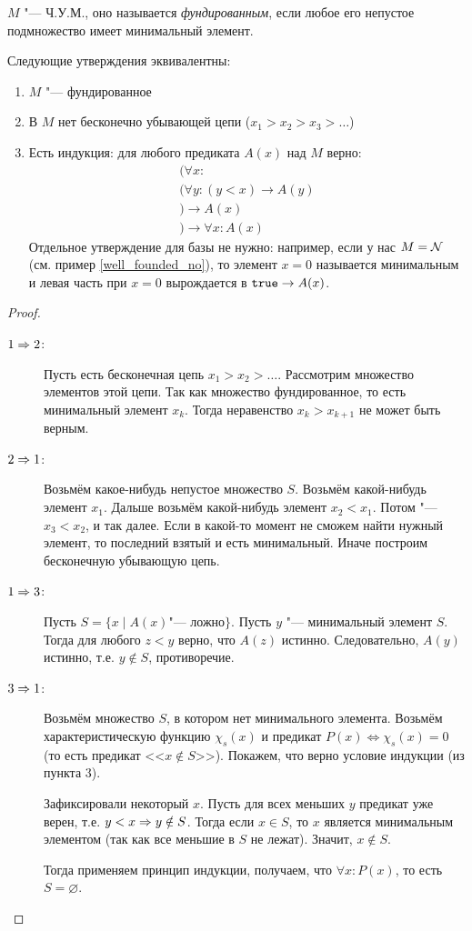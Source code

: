 \begin{Def}
	$M$ "--- Ч.У.М., оно называется \textit{фундированным}, если любое его непустое подмножество
	имеет минимальный элемент.
\end{Def}
\begin{theorem}
	Следующие утверждения эквивалентны:
	\begin{enumerate}
		\item $M$ "--- фундированное
		\item В $M$ нет бесконечно убывающей цепи ($x_1 > x_2 > x_3 > \dots$)
		\item
			Есть индукция: для любого предиката $A(x)$ над $M$ верно:
			\begin{gather*}
				(\forall x \colon\\
					(\forall y\colon (y < x) \to A(y) \\
					) \to A(x) \\
				) \to \forall x \colon A(x)
			\end{gather*}
			Отдельное утверждение для базы не нужно: например, если у нас $M=\mathcal{N}$ (см. пример \ref{well_founded_no}),
			то элемент $x=0$ называется минимальным и левая часть при $x=0$ вырождается в $\texttt{true} \to A(x)$.
	\end{enumerate}
\end{theorem}
\begin{proof}
	\begin{description}
		\item[$1 \Rightarrow 2$:]
			Пусть есть бесконечная цепь $x_1 > x_2 > \dots$.
			Рассмотрим множество элементов этой цепи.
			Так как множество фундированное, то есть минимальный элемент $x_k$.
			Тогда неравенство $x_k > x_{k+1}$ не может быть верным.

		\item[$2 \Rightarrow 1$:]
			Возьмём какое-нибудь непустое множество $S$.
			Возьмём какой-нибудь элемент $x_1$.
			Дальше возьмём какой-нибудь элемент $x_2 < x_1$.
			Потом "--- $x_3 < x_2$, и так далее.
			Если в какой-то момент не сможем найти нужный элемент, то последний взятый и есть минимальный.
			Иначе построим бесконечную убывающую цепь.

		\item[$1 \Rightarrow 3$:]
			Пусть $S=\{x \mid A(x) \text{"--- ложно}\}$.
			Пусть $y$ "--- минимальный элемент $S$.
			Тогда для любого $z<y$ верно, что $A(z)$ истинно.
			Следовательно, $A(y)$ истинно, т.е. $y \notin S$, противоречие.

		\item[$3 \Rightarrow 1$:]
			Возьмём множество $S$, в котором нет минимального элемента.
			Возьмём характеристическую функцию $\chi_s(x)$ и предикат $P(x) \iff \chi_s(x)=0$
			(то есть предикат <<$x \notin S$>>).
			Покажем, что верно условие индукции (из пункта 3).

			Зафиксировали некоторый $x$.
			Пусть для всех меньших $y$ предикат уже верен, т.е. $y < x \Rightarrow y \notin S$.
			Тогда если $x \in S$, то $x$ является минимальным элементом (так как все меньшие в $S$ не лежат).
			Значит, $x \notin S$.

			Тогда применяем принцип индукции, получаем, что $\forall x \colon P(x)$,
			то есть $S = \varnothing$.
	\end{description}
\end{proof}
